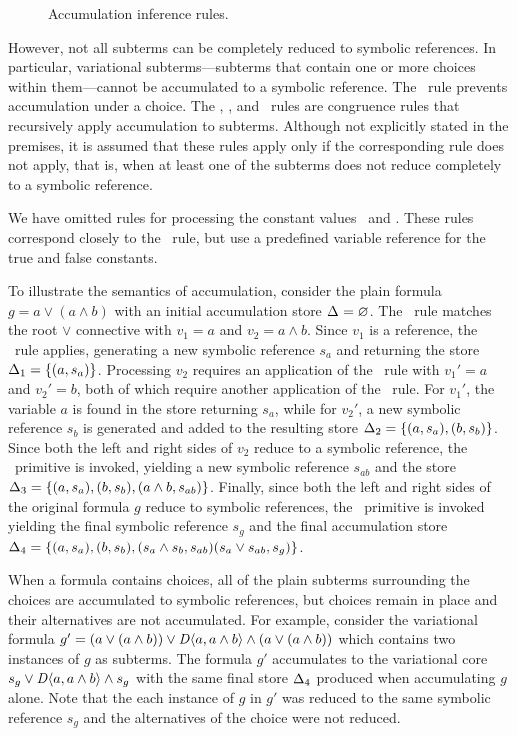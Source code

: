 \begin{figure}
  
  \caption{Accumulation inference rules.}
  \label{fig:vsmt:inf:acc}
\end{figure}


However, not all subterms can be completely reduced to symbolic references. In
particular, variational subterms---subterms that contain one or more choices
within them---cannot be accumulated to a symbolic reference.
%
The \acChc\ rule prevents accumulation under a choice.
%
The \acNotV, \acAndV, and \acOrV\ rules are congruence rules that recursively
apply accumulation to subterms. Although not explicitly stated in the premises,
it is assumed that these  rules apply only if the corresponding
 rule does not apply, that is, when at least one of the subterms does
not reduce completely to a symbolic reference.


We have omitted rules for processing the constant values \tru\ and \fls. These
rules correspond closely to the \acRef\ rule, but use a predefined variable
reference for the true and false constants.


To illustrate the semantics of accumulation, consider the plain formula
%
$g = a \vee (a \wedge b)$ with an initial accumulation store
$\Delta_{}=\varnothing$. The \acOrS\ rule matches the root $\vee$ connective
with $v_1=a$ and $v_2 = a \wedge b$.
%
Since $v_1$ is a reference, the \acRef\ rule applies, generating a new symbolic
reference $s_a$ and returning the store $\aStore{1}=\set{(a,s_a)}$.
%
Processing $v_2$ requires an application of the \acAndS\ rule with $v_1'=a$ and
$v_2'=b$, both of which require another application of the \acRef\ rule. For
$v_1'$, the variable $a$ is found in the store returning $s_a$, while for
$v_2'$, a new symbolic reference $s_b$ is generated and added to the resulting
store $\aStore{2}=\set{(a,s_a),(b,s_b)}$.
%
Since both the left and right sides of $v_2$ reduce to a symbolic reference,
the \pand\ primitive is invoked, yielding a new symbolic reference $s_{ab}$ and
the store $\aStore{3}=\set{(a,s_a),(b,s_b),(a \wedge b, s_{ab})}$.
%
Finally, since both the left and right sides of the original formula $g$ reduce
to symbolic references, the \por\ primitive is invoked yielding the final
symbolic reference $s_g$ and the final accumulation store
\( \aStore{4} =
  \set{
    (a,s_a), (b,s_b),
    (s_a \wedge s_b, s_{ab})
    (s_a \vee s_{ab}, s_g) }
\).


When a formula contains choices, all of the plain subterms surrounding the
choices are accumulated to symbolic references, but choices remain in place
and their alternatives are not accumulated. For example, consider the
variational formula
%
\( g' =
  (a \vee (a \wedge b)) \vee
  \chc[D]{a, a \wedge b} \wedge
  (a \vee (a \wedge b))
\)
%
which contains two instances of $g$ as subterms. The formula $g'$ accumulates
to the variational core
%
\( s_g \vee \chc[D]{a, a \wedge b} \wedge s_g \) with the same final store
$\Delta_{4}$ produced when accumulating $g$ alone.
%
Note that the each instance of $g$ in $g'$ was reduced to the same symbolic
reference $s_g$ and the alternatives of the choice were not reduced.


